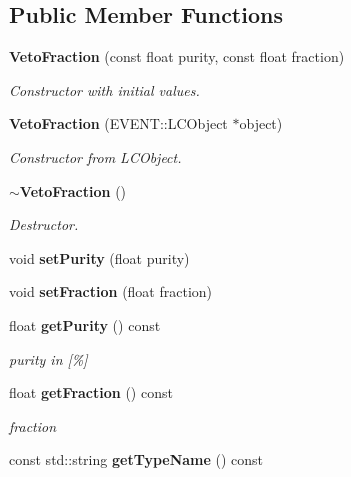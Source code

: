 \subsection*{Public Member Functions}
\begin{DoxyCompactItemize}
\item 
{\bf Veto\-Fraction} (const float purity, const float fraction)\label{classCALICE_1_1VetoFraction_a59c07a9bd31ae6165122a1b09411a483}

\begin{DoxyCompactList}\small\item\em Constructor with initial values. \end{DoxyCompactList}\item 
{\bf Veto\-Fraction} (E\-V\-E\-N\-T\-::\-L\-C\-Object $\ast$object)\label{classCALICE_1_1VetoFraction_ac5fd6ab373c417aac1c6868619bf90c2}

\begin{DoxyCompactList}\small\item\em Constructor from L\-C\-Object. \end{DoxyCompactList}\item 
{\bf $\sim$\-Veto\-Fraction} ()\label{classCALICE_1_1VetoFraction_a55a93867c38ed1f4bdfee8ca2ef831c6}

\begin{DoxyCompactList}\small\item\em Destructor. \end{DoxyCompactList}\item 
void {\bfseries set\-Purity} (float purity)\label{classCALICE_1_1VetoFraction_abd9f68b2c4142c9800f08ee310fb102f}

\item 
void {\bfseries set\-Fraction} (float fraction)\label{classCALICE_1_1VetoFraction_a7340533b1d5cd86a94225f7ccc9bad73}

\item 
float {\bf get\-Purity} () const \label{classCALICE_1_1VetoFraction_a2b458d1246e49a5b8176e8c224ba0ba1}

\begin{DoxyCompactList}\small\item\em purity in [\%] \end{DoxyCompactList}\item 
float {\bf get\-Fraction} () const 
\begin{DoxyCompactList}\small\item\em fraction \end{DoxyCompactList}\item 
const std\-::string {\bf get\-Type\-Name} () const \label{classCALICE_1_1VetoFraction_a1543156db25771800dc2b5af338f303a}


\end{DoxyCompactItemize}
